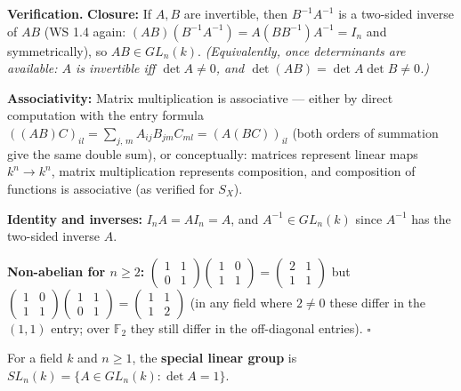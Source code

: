 \documentclass[11pt]{report}
\renewenvironment{proof}[1][Proof]{\noindent\textbf{#1.} }{\hfill$\square$\par\vspace{5pt}}
\begin{document}
\begin{proof}[Verification]
\textbf{Closure:} If $A, B$ are invertible, then $B^{-1}A^{-1}$ is a two-sided inverse of $AB$ (WS 1.4 again: $(AB)(B^{-1}A^{-1}) = A(BB^{-1})A^{-1} = I_n$ and symmetrically), so $AB \in GL_n(k)$. \textit{(Equivalently, once determinants are available: $A$ is invertible iff $\det A \neq 0$, and $\det(AB) = \det A \det B \neq 0$.)}

\textbf{Associativity:} Matrix multiplication is associative --- either by direct computation with the entry formula $\left( (AB)C \right)_{il} = \sum_{j,\,m} A_{ij} B_{jm} C_{ml} = \left( A(BC) \right)_{il}$ (both orders of summation give the same double sum), or conceptually: matrices represent linear maps $k^n \to k^n$, matrix multiplication represents composition, and composition of functions is associative (as verified for $S_X$).

\textbf{Identity and inverses:} $I_n A = A I_n = A$, and $A^{-1} \in GL_n(k)$ since $A^{-1}$ has the two-sided inverse $A$.

\textbf{Non-abelian for $n \geq 2$:}
$\begin{pmatrix} 1 & 1 \\ 0 & 1 \end{pmatrix}\begin{pmatrix} 1 & 0 \\ 1 & 1 \end{pmatrix} = \begin{pmatrix} 2 & 1 \\ 1 & 1 \end{pmatrix}$ but
$\begin{pmatrix} 1 & 0 \\ 1 & 1 \end{pmatrix}\begin{pmatrix} 1 & 1 \\ 0 & 1 \end{pmatrix} = \begin{pmatrix} 1 & 1 \\ 1 & 2 \end{pmatrix}$
(in any field where $2 \neq 0$ these differ in the $(1,1)$ entry; over $\mathbb{F}_2$ they still differ in the off-diagonal entries).
\end{proof}

\begin{defbox}\label{def:special-linear-orthogonal-special-orthogonal}
For a field $k$ and $n \geq 1$, the \textbf{special linear group} is $SL_n(k) = \{A \in GL_n(k) : \det A = 1\}$.
\end{defbox}
\end{document}
